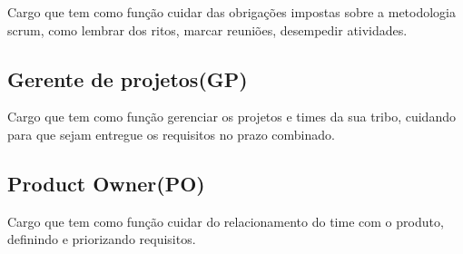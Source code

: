 Cargo que tem como função cuidar das obrigações impostas sobre a metodologia scrum, como lembrar dos ritos, marcar reuniões, desempedir atividades.

\subsection{Gerente de projetos(GP)}

Cargo que tem como função gerenciar os projetos e times da sua
 tribo, cuidando para que sejam entregue os requisitos no prazo combinado.

\subsection{Product Owner(PO)}
Cargo que tem como função cuidar do relacionamento do time com o produto,
 definindo e priorizando requisitos.